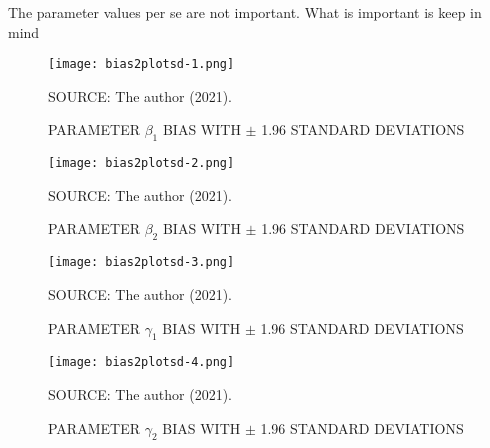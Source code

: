 \vspace{0.3cm}
\noindent
The parameter values per se are not important. What is important is keep
in mind

\begin{figure}[H]
 \setlength{\abovecaptionskip}{.0001pt}
 \caption{PARAMETER \(\beta_{1}\) BIAS WITH \(\pm\) 1.96 STANDARD
          DEVIATIONS}
 \vspace{0.2cm}\centering
 \texttt{[image: bias2plotsd-1.png]}\\
 \begin{footnotesize}
  SOURCE: The author (2021).
 \end{footnotesize}
 \label{fig:biassdbeta1}
\end{figure}

\begin{figure}[H]
 \setlength{\abovecaptionskip}{.0001pt}
 \caption{PARAMETER \(\beta_{2}\) BIAS WITH \(\pm\) 1.96 STANDARD
         DEVIATIONS}
 \vspace{0.2cm}\centering
 \texttt{[image: bias2plotsd-2.png]}\\
 \begin{footnotesize}
  SOURCE: The author (2021).
 \end{footnotesize}
 \label{fig:biassdbeta2}
\end{figure}

\begin{figure}[H]
 \setlength{\abovecaptionskip}{.0001pt}
 \caption{PARAMETER \(\gamma_{1}\) BIAS WITH \(\pm\) 1.96 STANDARD
          DEVIATIONS}
 \vspace{0.2cm}\centering
 \texttt{[image: bias2plotsd-3.png]}\\
 \begin{footnotesize}
  SOURCE: The author (2021).
 \end{footnotesize}
 \label{fig:biassdgama1}
\end{figure}

\begin{figure}[H]
 \setlength{\abovecaptionskip}{.0001pt}
 \caption{PARAMETER \(\gamma_{2}\) BIAS WITH \(\pm\) 1.96 STANDARD
          DEVIATIONS}
 \vspace{0.2cm}\centering
 \texttt{[image: bias2plotsd-4.png]}\\
 \begin{footnotesize}
  SOURCE: The author (2021).
 \end{footnotesize}
 \label{fig:biassdgama2}
\end{figure}

